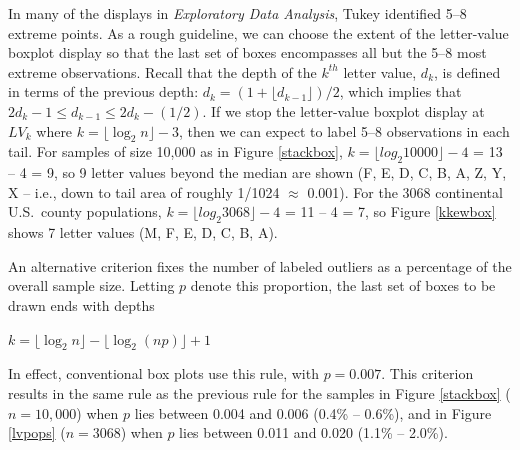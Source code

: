 \documentclass[oneside]{article}
\begin{document}
In many of the displays in \textit{Exploratory
Data Analysis}, Tukey identified 5--8 extreme points.
As a rough guideline, we can choose the extent
of the letter-value boxplot display so that
the last set of boxes encompasses all but
the 5--8 most extreme observations.
Recall that the depth of the $k^{th}$ letter value,
$d_k$, is defined in terms of the previous depth:
$d_k = (1 + \lfloor d_{k-1} \rfloor)/2$, which
implies that 
$2 d_{k} -1 \leq d_{k-1} \leq 2 d_k - (1/2)$.
If we stop the letter-value boxplot display at
$LV_k$ where $k = \lfloor \log_2 n \rfloor - 3$,
then we can expect to label 5--8 observations
in each tail.  For samples of size
10,000 as in Figure \ref{stackbox},
$k = \lfloor log_2 10000 \rfloor - 4$ = 13 -- 4 = 9,
so 9 letter values beyond the median are shown
(F, E, D, C, B, A, Z, Y, X -- i.e., down to
tail area of roughly 1/1024 $\approx$ 0.001).
For the 3068 continental U.S.~county populations,
$k = \lfloor log_2 3068 \rfloor - 4$ = 11 -- 4 = 7,
so Figure \ref{kkewbox} shows
7 letter values (M, F, E, D, C, B, A).


An alternative criterion fixes the number of
labeled outliers as a percentage of
the overall sample size.  Letting $p$ denote
this proportion, the last set of boxes to be
drawn ends with depths
\begin{center}
$k = \lfloor \log_2 n \rfloor - \lfloor \log_2 (np) \rfloor + 1$
\end{center}
In effect, conventional box plots use this rule, with $p = 0.007$.
This criterion results in the same rule 
as the previous rule for the samples in
Figure \ref{stackbox} ($n = 10,000$) when 
$p$ lies between 0.004 and 0.006 (0.4\% -- 0.6\%), 
and in Figure \ref{lvpops} ($n = 3068$) when
$p$ lies between 0.011 and 0.020 (1.1\% -- 2.0\%).
\end{document}

